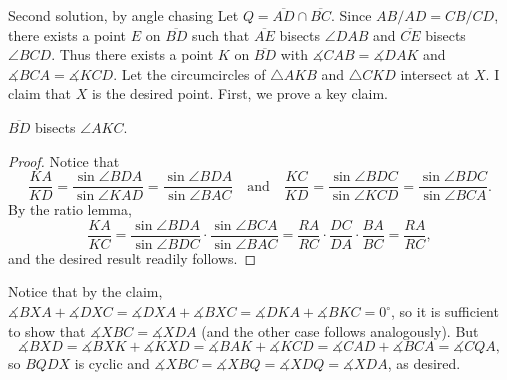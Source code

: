 \begin{customenv}{Second solution, by angle chasing}
    Let $Q=\overline{AD}\cap\overline{BC}$. Since $AB/AD=CB/CD$, there exists a point $E$ on $\overline{BD}$ such that $\overline{AE}$ bisects $\angle DAB$ and $\overline{CE}$ bisects $\angle BCD$. Thus there exists a point $K$ on $\overline{BD}$ with $\measuredangle CAB=\measuredangle DAK$ and $\measuredangle BCA=\measuredangle KCD$. Let the circumcircles of $\triangle AKB$ and $\triangle CKD$ intersect at $X$. I claim that $X$ is the desired point. First, we prove a key claim.
    \begin{iclaim*}
        $\overline{BD}$ bisects $\angle AKC$.
    \end{iclaim*}
    \begin{proof}
        Notice that \[\frac{KA}{KD}=\frac{\sin\angle BDA}{\sin\angle KAD}=\frac{\sin\angle BDA}{\sin\angle BAC}\quad\text{and}\quad\frac{KC}{KD}=\frac{\sin\angle BDC}{\sin\angle KCD}=\frac{\sin \angle BDC}{\sin\angle BCA}.\]
        By the ratio lemma, \[\frac{KA}{KC}=\frac{\sin\angle BDA}{\sin\angle BDC}\cdot\frac{\sin\angle BCA}{\sin\angle BAC}=\frac{RA}{RC}\cdot\frac{DC}{DA}\cdot\frac{BA}{BC}=\frac{RA}{RC},\]
        and the desired result readily follows.
    \end{proof}

    Notice that by the claim, $\measuredangle BXA+\measuredangle DXC=\measuredangle DXA+\measuredangle BXC=\measuredangle DKA+\measuredangle BKC=0^\circ$, so it is sufficient to show that $\measuredangle XBC=\measuredangle XDA$ (and the other case follows analogously). But \[\measuredangle BXD=\measuredangle BXK+\measuredangle KXD=\measuredangle BAK+\measuredangle KCD=\measuredangle CAD+\measuredangle BCA=\measuredangle CQA,\]
    so $BQDX$ is cyclic and $\measuredangle XBC=\measuredangle XBQ=\measuredangle XDQ=\measuredangle XDA$, as desired.
\end{customenv}
